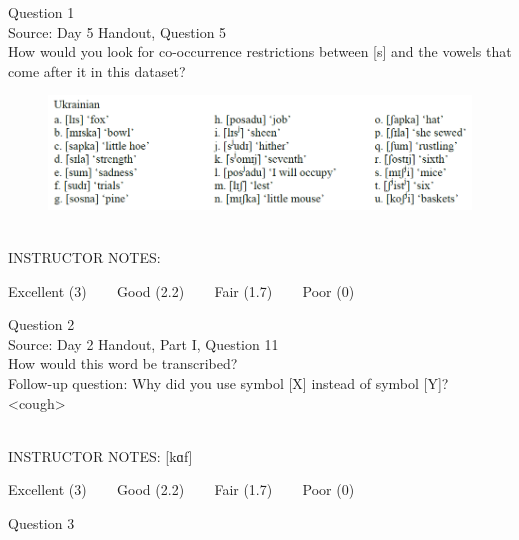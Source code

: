 \documentclass[12pt]{article}
\begin{document}
\begin{center}
\textbf{{\color{blue}{\HUGE START OF EXAM\\}}}

\textbf{{\color{blue}{\HUGE Student ID: 5581\\}}}

\textbf{{\color{blue}{\HUGE 2:45 - 3:00 PM\\}}}

\end{center}
\newpage

{\large Question 1}\\

Source: Day 5 Handout, Question 5\\

How would you look for co-occurrence restrictions between [s] and the vowels that come after it in this dataset?\\

\begin{figure}[H]
\includegraphics{../images/ukrainian.png}
\end{figure}

~\\
INSTRUCTOR NOTES: 


\vfill
Excellent (3) ~~~ Good (2.2) ~~~ Fair (1.7) ~~~ Poor (0)
\newpage

{\large Question 2}\\

Source: Day 2 Handout, Part I, Question 11\\

How would this word be transcribed?\\ Follow-up question: Why did you use symbol [X] instead of symbol [Y]?\\

<cough>


~\\
INSTRUCTOR NOTES: [kɑf]


\vfill
Excellent (3) ~~~ Good (2.2) ~~~ Fair (1.7) ~~~ Poor (0)
\newpage

{\large Question 3}\\
\end{document}
